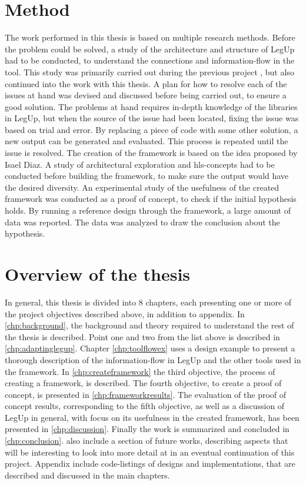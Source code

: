 \section{Method}
The work performed in this thesis is based on multiple research methods. Before the problem could be solved, a study of the architecture and structure of LegUp had to be conducted, to understand the connections and information-flow in the tool. This study was primarily carried out during the previous project \cite{holm2015pro}, but also continued into the work with this thesis. A plan for how to resolve each of the issues at hand was devised and discussed before being carried out, to ensure a good solution. The problems at hand requires in-depth knowledge of the libraries in LegUp, but when the source of the issue had been located, fixing the issue was based on trial and error. By replacing a piece of code with some other solution, a new output can be generated and evaluated. This process is repeated until the issue is resolved. The creation of the framework is based on the idea proposed by Isael Diaz. A study of architectural exploration and \gls{hls}-concepts had to be conducted before building the framework, to make sure the output would have the desired diversity. An experimental study of the usefulness of the created framework was conducted as a proof of concept, to check if the initial hypothesis holds. By running a reference design through the framework, a large amount of data was reported. The data was analyzed to draw the conclusion about the hypothesis.

\section{Overview of the thesis}
In general, this thesis is divided into 8 chapters, each presenting one or more of the project objectives described above, in addition to appendix. In \cref{chp:background}, the background and theory required to understand the rest of the thesis is described. Point one and two from the list above is described in \cref{chp:adaptinglegup}. Chapter \ref{chp:toolflowex} uses a design example to present a thorough description of the information-flow in LegUp and the other tools used in the framework. In \cref{chp:createframework} the third objective, the process of creating a framework, is described. The fourth objective, to create a proof of concept, is presented in \cref{chp:frameworkresults}. The evaluation of the proof of concept results, corresponding to the fifth objective, as well as a discussion of LegUp in general, with focus on its usefulness in the created framework, has been presented in \cref{chp:discussion}. Finally the work is summarized and concluded in \cref{chp:conclusion}.  also include a section of future works, describing aspects that will be interesting to look into more detail at in an eventual continuation of this project. Appendix include code-listings of designs and implementations, that are described and discussed in the main chapters.
